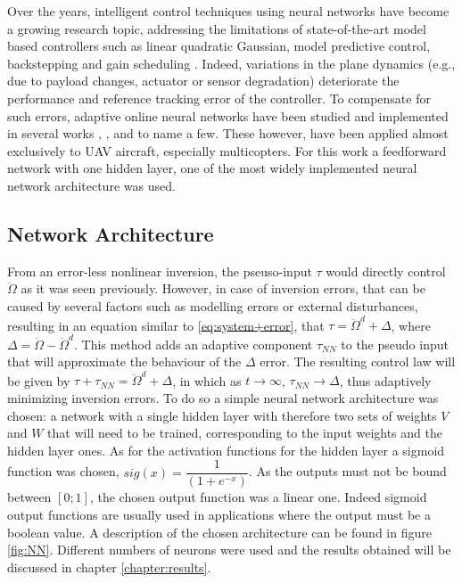Over the years, intelligent control techniques using neural networks have become a growing research topic, addressing the limitations of state-of-the-art model based controllers such as linear quadratic Gaussian, model predictive control, backstepping and gain scheduling \citep{SotA_IFCS}. Indeed, variations in the plane dynamics (e.g., due to payload changes, actuator or sensor degradation) deteriorate the performance and reference tracking error of the controller. To compensate for such errors, adaptive online neural networks have been studied and implemented in several works \cite{quad_NLI+NN}, \cite{NN_PID}, \cite{UAV_adaptive} and \cite{NN_NLI} to name a few. These however, have been applied almost exclusively to UAV aircraft, especially multicopters. For this work a feedforward network with one hidden layer, one of the most widely implemented neural network architecture \cite{SotA_IFCS} was used.


\subsection{Network Architecture}
From an error-less nonlinear inversion, the pseuso-input $\tau$ would directly control $\ddot{\Omega}$ as it was seen previously. However, in case of inversion errors, that can be caused by several factors such as modelling errors or external disturbances, resulting in an equation similar to \ref{eq:system+error}, that $\tau = \ddot{\Omega}^d + \Delta$, where $\Delta = \ddot{\Omega}- \ddot{\Omega} ^d$. This method adds an adaptive component $\tau_{NN}$ to the pseudo input that will approximate the behaviour of the $\Delta$ error. The resulting control law will be given by $\tau + \tau_{NN} = \ddot{\Omega}^d + \Delta$, in which as $t \rightarrow \infty$, $\tau_{NN} \rightarrow \Delta$, thus adaptively minimizing inversion errors. To do so a simple neural network architecture was chosen: a network with a single hidden layer with therefore two sets of weights $V$ and $W$ that will need to be trained, corresponding to the input weights and the hidden layer ones. As for the activation functions for the hidden layer a sigmoid function was chosen, $sig(x)=\dfrac{1}{(1+e^{-x})}$. As the outputs must not be bound between $[0;1]$, the chosen output function was a linear one. Indeed sigmoid output functions are usually used in applications where the output must be a boolean value. A description of the chosen architecture can be found in figure \ref{fig:NN}. Different numbers of neurons were used and the results obtained will be discussed in chapter \ref{chapter:results}.


